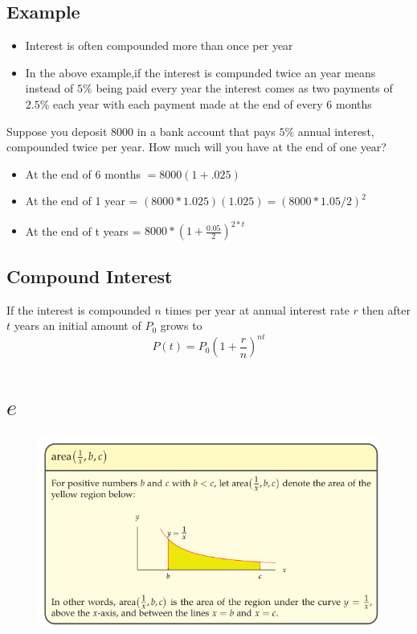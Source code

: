 \subsection{Example}
\begin{itemize}
  \item Interest is often compounded more than once per year
  \item In the above example,if the interest is compunded twice an year means instead of \(5\%\) being paid every year the interest comes as two payments of \(2.5\%\) each year with each payment made at the end of every 6 months
\end{itemize}
Suppose you deposit \(8000\) in a bank account that pays \(5\%\) annual interest, compounded twice per year. How much will you have at the end of one year?
\begin{itemize}
  \item At the end of 6 months \(= 8000(1+.025) \)
  \item At the end of 1 year = \( (8000*1.025)(1.025) = (8000*1.05/2)^2 \)
  \item At the end of t years = \(8000*(1+\frac{0.05}{2})^{2*t} \)
\end{itemize}

\subsection{Compound Interest}
If the interest is compounded \(n\) times per year at annual interest rate \(r\) then after \(t\) years an initial amount of \(P_{0}\) grows to
\[P(t) = P_{0}(1+\frac{r}{n})^{nt}\]

\section{\( e \)}
\begin{figure}
  \includegraphics[scale=0.5]{pics/e_1.png}
\end{figure}

